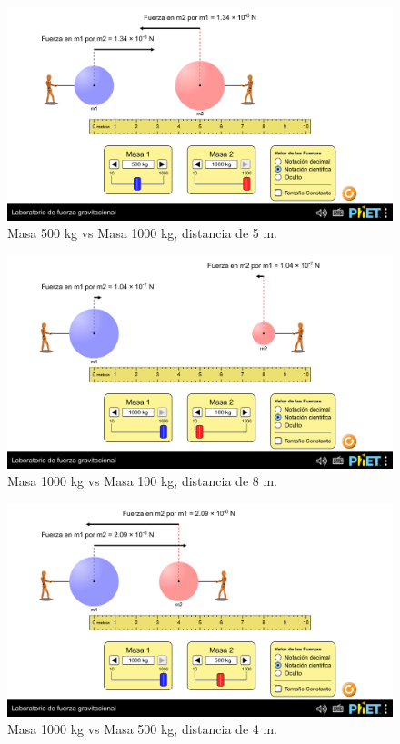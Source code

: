 \documentclass[a4paper,12pt]{article}
\begin{document}
\begin{figure}[h]
    \centering
    \includegraphics[width=1\linewidth]{m1_500_m2_1000_r_5.png}
    \caption{Masa 500 kg vs Masa 1000 kg, distancia de 5 m.}
\end{figure}

\begin{figure}[h]
    \centering
    \includegraphics[width=1\linewidth]{m1_1000_m2_100_r_8.png}
    \caption{Masa 1000 kg vs Masa 100 kg, distancia de 8 m.}
\end{figure}

\begin{figure}[h]
    \centering
    \includegraphics[width=1\linewidth]{m1_1000_m2_500_r_4.png}
    \caption{Masa 1000 kg vs Masa 500 kg, distancia de 4 m.}
\end{figure}
\end{document}
